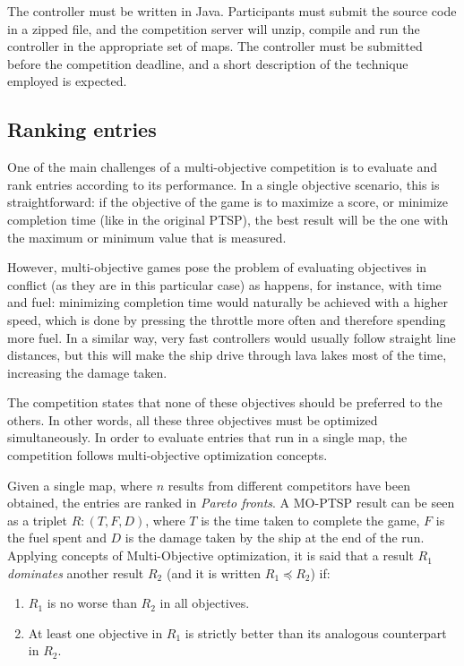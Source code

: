 \documentclass[conference]{IEEEtran}
\begin{document}
The controller must be written in Java. Participants must submit the source code in a zipped file, and the competition server will unzip, compile and run the controller in the appropriate set of maps. The controller must be submitted before the competition deadline, and a short description of the technique employed is expected.


\subsection{Ranking entries}

One of the main challenges of a multi-objective competition is to evaluate and rank entries according to its performance. In a single objective scenario, this is straightforward: if the objective of the game is to maximize a score, or minimize completion time (like in the original PTSP), the best result will be the one with the maximum or minimum value that is measured.

However, multi-objective games pose the problem of evaluating objectives in conflict (as they are in this particular case) as happens, for instance, with time and fuel: minimizing completion time would naturally be achieved with a higher speed, which is done by pressing the throttle more often and therefore spending more fuel. In a similar way, very fast controllers  would usually follow straight line distances, but this will make the ship drive through lava lakes most of the time, increasing the damage taken.

The competition states that none of these objectives should be preferred to the others. In other words, all these three objectives must be optimized simultaneously. In order to evaluate entries that run in a single map, the competition follows multi-objective optimization concepts. 

Given a single map, where $n$ results from different competitors have been obtained, the entries are ranked in \textit{Pareto fronts}. A MO-PTSP result can be seen as a triplet $R: (T, F, D)$, where $T$ is the time taken to complete the game, $F$ is the fuel spent and $D$ is the damage taken by the ship at the end of the run. Applying concepts of Multi-Objective optimization, it is said that a result $R_1$ \textit{dominates} another result $R_2$ (and it is written $R_1 \preceq R_2$) if:

\begin{enumerate}
\item $R_1$ is no worse than $R_2$ in all objectives.
\item At least one objective in $R_1$ is strictly better than its analogous counterpart in $R_2$.
\end{enumerate}
\end{document}

